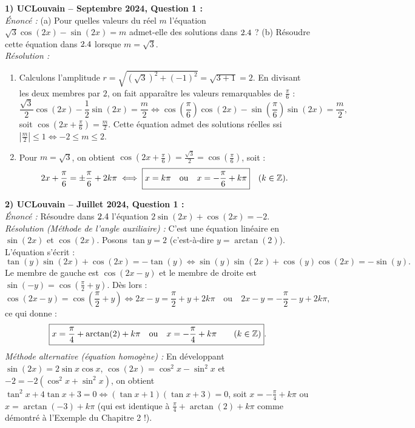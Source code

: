 \begin{exemple}
\textbf{1) UCLouvain -- Septembre 2024, Question 1 :}\\
\emph{Énoncé :} (a) Pour quelles valeurs du réel $m$ l'équation $\sqrt{3}\cos(2x) - \sin(2x) = m$ admet-elle des solutions dans $2.4$ ? (b) Résoudre cette équation dans $2.4$ lorsque $m = \sqrt{3}$.\\
\emph{Résolution :}
\begin{enumerate}[label=(\alph*)]
    \item Calculons l'amplitude $r = \sqrt{(\sqrt{3})^2 + (-1)^2} = \sqrt{3 + 1} = 2$. En divisant les deux membres par $2$, on fait apparaître les valeurs remarquables de $\frac{\pi}{6}$ :
    \[
        \frac{\sqrt{3}}{2}\cos(2x) - \frac{1}{2}\sin(2x) = \frac{m}{2} \iff \cos\left(\frac{\pi}{6}\right)\cos(2x) - \sin\left(\frac{\pi}{6}\right)\sin(2x) = \frac{m}{2},
    \]
    soit $\cos\left(2x + \frac{\pi}{6}\right) = \frac{m}{2}$. Cette équation admet des solutions réelles ssi $\left|\frac{m}{2}\right| \le 1 \iff \boxed{-2 \le m \le 2}$.
    \item Pour $m = \sqrt{3}$, on obtient $\cos\left(2x + \frac{\pi}{6}\right) = \frac{\sqrt{3}}{2} = \cos\left(\frac{\pi}{6}\right)$, soit :
    \[
        2x + \frac{\pi}{6} = \pm\frac{\pi}{6} + 2k\pi \iff \boxed{x = k\pi \quad \text{ou} \quad x = -\frac{\pi}{6} + k\pi} \quad (k\in\mathbb{Z}).
    \]
\end{enumerate}

\medskip
\textbf{2) UCLouvain -- Juillet 2024, Question 1 :}\\
\emph{Énoncé :} Résoudre dans $2.4$ l'équation $2\sin(2x) + \cos(2x) = -2$.\\
\emph{Résolution (Méthode de l'angle auxiliaire) :} C'est une équation linéaire en $\sin(2x)$ et $\cos(2x)$. Posons $\tan y = 2$ (c'est-à-dire $y = \arctan(2)$). L'équation s'écrit :
\[
    \tan(y)\sin(2x) + \cos(2x) = -\tan(y) \iff \sin(y)\sin(2x) + \cos(y)\cos(2x) = -\sin(y).
\]
Le membre de gauche est $\cos(2x - y)$ et le membre de droite est $\sin(-y) = \cos\left(\frac{\pi}{2} + y\right)$. Dès lors :
\[
    \cos(2x - y) = \cos\left(\frac{\pi}{2} + y\right) \iff 2x - y = \frac{\pi}{2} + y + 2k\pi \quad \text{ou} \quad 2x - y = -\frac{\pi}{2} - y + 2k\pi,
\]
ce qui donne :
\[
    \boxed{x = \frac{\pi}{4} + \arctan(2) + k\pi \quad \text{ou} \quad x = -\frac{\pi}{4} + k\pi \qquad (k \in \mathbb{Z})}.
\]
\emph{Méthode alternative (équation homogène) :} En développant $\sin(2x) = 2\sin x\cos x$, $\cos(2x) = \cos^2 x - \sin^2 x$ et $-2 = -2(\cos^2 x + \sin^2 x)$, on obtient $\tan^2 x + 4\tan x + 3 = 0 \iff (\tan x + 1)(\tan x + 3) = 0$, soit $x = -\frac{\pi}{4} + k\pi$ ou $x = \arctan(-3) + k\pi$ (qui est identique à $\frac{\pi}{4} + \arctan(2) + k\pi$ comme démontré à l'Exemple du Chapitre 2 !).
\end{exemple}


